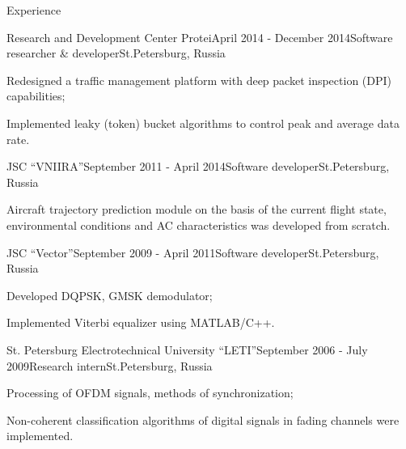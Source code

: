 \documentclass{resume} %
\begin{document}
\begin{rSection}{Experience}

\begin{rSubsection}{Research and Development Center Protei}{April 2014 - December 2014}{Software researcher \& developer}{St.Petersburg, Russia}
\item Redesigned a traffic management platform with deep packet inspection (DPI) capabilities;
\item Implemented leaky (token) bucket algorithms to control peak and average data rate.
\end{rSubsection}


\begin{rSubsection}{JSC “VNIIRA”}{September 2011 - April 2014}{Software developer}{St.Petersburg, Russia}
\item Aircraft trajectory prediction module on the basis of the current flight state, environmental conditions and AC characteristics was developed from scratch.
\end{rSubsection}


\begin{rSubsection}{JSC “Vector”}{September 2009 - April 2011}{Software developer}{St.Petersburg, Russia}
\item Developed DQPSK, GMSK demodulator;
\item Implemented Viterbi equalizer using MATLAB/C++.
\end{rSubsection}


\begin{rSubsection}{St. Petersburg Electrotechnical University “LETI”}{September 2006 - July 2009}{Research intern}{St.Petersburg, Russia}
\item Processing of OFDM signals, methods of synchronization;
\item Non-coherent classification algorithms of digital signals in fading channels were
implemented.
\end{rSubsection}

\end{rSection}
\bigskip

\end{document}

